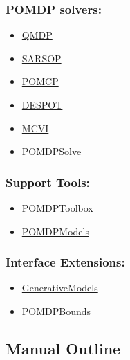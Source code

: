 \documentclass[12pt,]{article}
\providecommand{\tightlist}{%
  \setlength{\itemsep}{0pt}\setlength{\parskip}{0pt}}
\begin{document}
\subsubsection{POMDP solvers:}\label{pomdp-solvers}

\begin{itemize}
\tightlist
\item
  \href{https://github.com/JuliaPOMDP/QMDP.jl}{QMDP}
\item
  \href{https://github.com/JuliaPOMDP/SARSOP.jl}{SARSOP}
\item
  \href{https://github.com/JuliaPOMDP/POMCP.jl}{POMCP}
\item
  \href{https://github.com/JuliaPOMDP/DESPOT.jl}{DESPOT}
\item
  \href{https://github.com/JuliaPOMDP/MCVI.jl}{MCVI}
\item
  \href{https://github.com/JuliaPOMDP/POMDPSolve.jl}{POMDPSolve}
\end{itemize}

\subsubsection{Support Tools:}\label{support-tools}

\begin{itemize}
\tightlist
\item
  \href{https://github.com/JuliaPOMDP/POMDPToolbox.jl}{POMDPToolbox}
\item
  \href{https://github.com/JuliaPOMDP/POMDPModels.jl}{POMDPModels}
\end{itemize}

\subsubsection{Interface Extensions:}\label{interface-extensions}

\begin{itemize}
\tightlist
\item
  \href{https://github.com/JuliaPOMDP/GenerativeModels.jl}{GenerativeModels}
\item
  \href{https://github.com/JuliaPOMDP/POMDPBounds.jl}{POMDPBounds}
\end{itemize}

\subsection{Manual Outline}\label{manual-outline}
\end{document}
